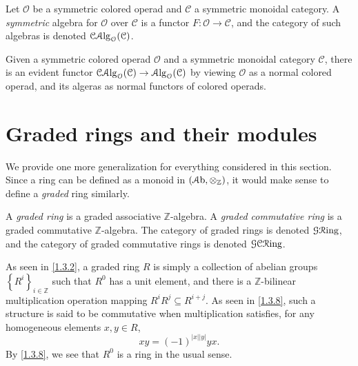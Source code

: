 \begin{definition}\label{1.3.9}
	Let $\mathcal{O} $ be a symmetric colored operad and $\mathcal{C} $ a symmetric monoidal category. A \emph{symmetric} algebra for $\mathcal{O} $ over $\mathcal{C} $ is a functor $F : \mathcal{O}  \to \mathcal{C} $, and the category of such algebras is denoted $\mathcal{C} \mathcal{A}\mathrm{lg}_\mathcal{O} (\mathcal{C} )$.
\end{definition}
\begin{remark}\label{1.3.10}
	Given a symmetric colored operad $\mathcal{O} $ and a symmetric monoidal category $\mathcal{C} $, there is an evident functor $\mathcal{C} \mathcal{A}\mathrm{lg}_\mathcal{O} (\mathcal{C} )\to \mathcal{A}\mathrm{lg}_\mathcal{O} (\mathcal{C} )$ by viewing $\mathcal{O} $ as a normal colored operad, and its algeras as normal functors of colored operads.
\end{remark}


\section{Graded rings and their modules}\label{sec:1.4}

We provide one more generalization for everything considered in this section. Since a ring can be defined as a monoid in $(\mathcal{A}\mathrm{b} ,\otimes _\mathbb{Z} )$, it would make sense to define a \emph{graded} ring similarly.

\begin{definition}\label{1.4.1}
	A \emph{graded ring} is a graded associative $\mathbb{Z} $-algebra. A \emph{graded commutative ring} is a graded commutative $\mathbb{Z} $-algebra. The category of graded rings is denoted $\mathcal{G} \mathcal{R}\mathrm{ing} $, and the category of graded commutative rings is denoted $\mathcal{G} \mathcal{C} \mathcal{R}\mathrm{ing} $.
\end{definition}

\begin{discussion}\label{1.4.2}
	As seen in \cref{1.3.2}, a graded ring $R$ is simply a collection of abelian groups $\left\{ R^i \right\} _{i\in\mathbb{Z} } $ such that $R^0$ has a unit element, and there is a $\mathbb{Z} $-bilinear multiplication operation mapping $R^iR^j \subseteq R^{i+j} $. As seen in \cref{1.3.8}, such a structure is said to be commutative when multiplication satisfies, for any homogeneous elements $x,y\in R$,
	\[
		xy=(-1)^{\left| x \right| \left| y \right| } yx
	.\]
	By \cref{1.3.8}, we see that $R^0$ is a ring in the usual sense.
\end{discussion}


